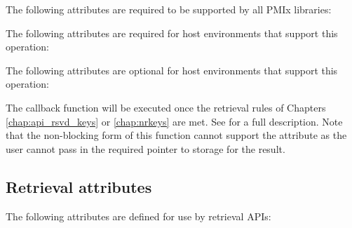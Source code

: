 \reqattrstart
The following attributes are required to be supported by all \ac{PMIx} libraries:


\divider

The following attributes are required for host environments that support this operation:


\reqattrend

\optattrstart
The following attributes are optional for host environments that support this operation:


\optattrend

\descr

The callback function will be executed once the retrieval rules of Chapters \ref{chap:api_rsvd_keys} or \ref{chap:nrkeys} are met.
See  for a full description. Note that the non-blocking form of this function cannot support the  attribute as the user cannot pass in the required pointer to storage for the result.


\subsection{Retrieval attributes}
\label{chap:api_kg:attr}

The following attributes are defined for use by retrieval \acp{API}:

